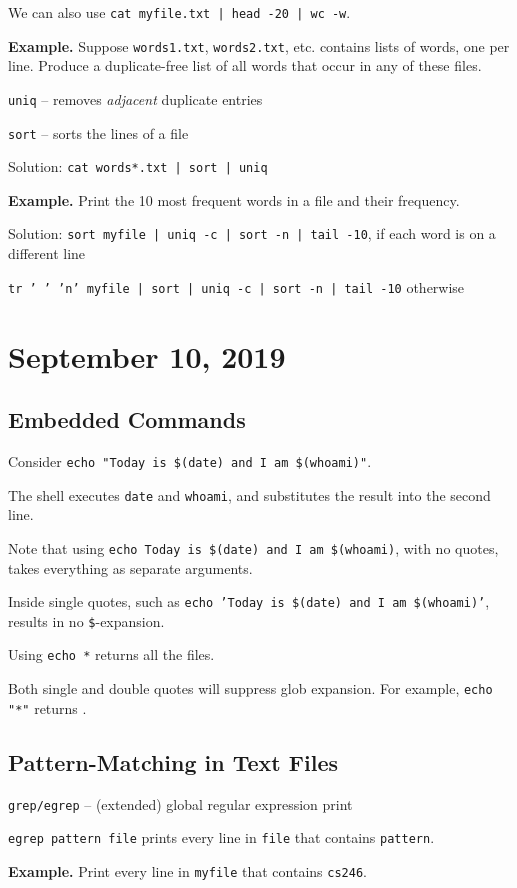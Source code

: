 \documentclass[11pt]{article}
\theoremstyle{definition}
\begin{document}
We can also use {\tt cat myfile.txt | head -20 | wc -w}.

{\bf Example.} Suppose {\tt words1.txt}, {\tt words2.txt}, etc. contains lists of words, one per line. Produce a duplicate-free list of all words that occur in any of these files.

{\tt uniq} -- removes {\em adjacent} duplicate entries

{\tt sort} -- sorts the lines of a file

Solution: {\tt cat words*.txt | sort | uniq}

{\bf Example.} Print the 10 most frequent words in a file and their frequency.

Solution: {\tt sort myfile | uniq -c | sort -n | tail -10}, if each word is on a different line

{\tt tr ' ' 'n' myfile | sort | uniq -c | sort -n | tail -10} otherwise
\newpage
\section{September 10, 2019}
\subsection{Embedded Commands}
Consider {\tt echo "Today is \$(date) and I am \$(whoami)"}. 

The shell executes {\tt date} and {\tt whoami}, and substitutes the result into the second line.

Note that using {\tt echo Today is \$(date) and I am \$(whoami)}, with no quotes, takes everything as separate arguments.

Inside single quotes, such as {\tt echo 'Today is \$(date) and I am \$(whoami)'}, results in no {\tt \$}-expansion.

Using {\tt echo *} returns all the files.

Both single and double quotes will suppress glob expansion. For example, {\tt echo "*"} returns {\tt *}.

\subsection{Pattern-Matching in Text Files}
{\tt grep/egrep} -- (extended) global regular expression print

{\tt egrep pattern file} prints every line in {\tt file} that contains {\tt pattern}.

{\bf Example.} Print every line in {\tt myfile} that contains {\tt cs246}.
\end{document}
